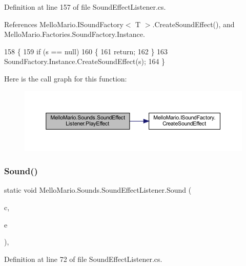Definition at line 157 of file Sound\+Effect\+Listener.\+cs.



References Mello\+Mario.\+I\+Sound\+Factory$<$ T $>$.\+Create\+Sound\+Effect(), and Mello\+Mario.\+Factories.\+Sound\+Factory.\+Instance.


\begin{DoxyCode}
158         \{
159             \textcolor{keywordflow}{if} (s == null)
160             \{
161                 \textcolor{keywordflow}{return};
162             \}
163             SoundFactory.Instance.CreateSoundEffect(s);
164         \}
\end{DoxyCode}
Here is the call graph for this function\+:
\nopagebreak
\begin{figure}[H]
\begin{center}
\leavevmode
\includegraphics[width=350pt]{classMelloMario_1_1Sounds_1_1SoundEffectListener_aadfaddabd043922db12d673e17547894_cgraph}
\end{center}
\end{figure}
\mbox{\label{classMelloMario_1_1Sounds_1_1SoundEffectListener_a60b0b71ce99a9fb742616370ec6f3846}} 
\subsubsection{Sound()}
{\footnotesize\ttfamily static void Mello\+Mario.\+Sounds.\+Sound\+Effect\+Listener.\+Sound (\begin{DoxyParamCaption}\item[{\textbf{ I\+Soundable}}]{c,  }\item[{\textbf{ I\+Sound\+Args}}]{e }\end{DoxyParamCaption})\hspace{0.3cm}{\ttfamily [static]}, {\ttfamily [private]}}



Definition at line 72 of file Sound\+Effect\+Listener.\+cs.



